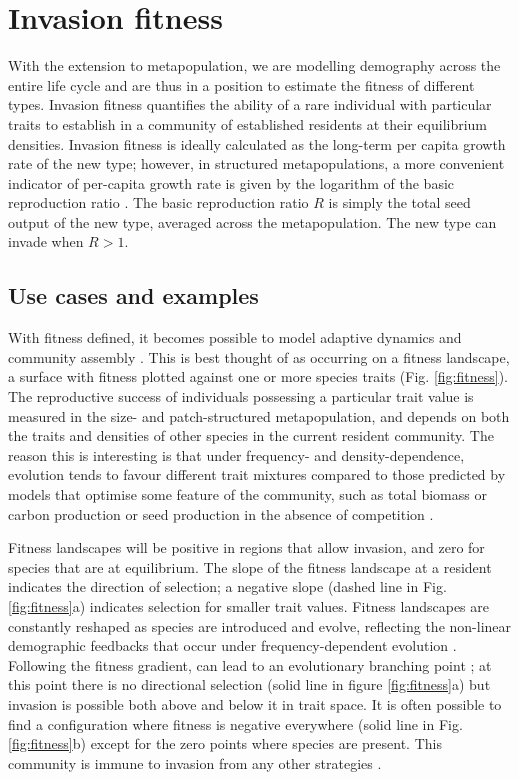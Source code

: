 \documentclass[a4paper,11pt]{article}
\begin{document}
\section{Invasion fitness}

With the extension to metapopulation, we are modelling demography across
the entire life cycle and are thus in a position to estimate the fitness
of different types. Invasion fitness quantifies the ability of a rare
individual with particular traits to establish in a community of
established residents at their equilibrium densities\citep{Metz-1992}.
Invasion fitness
is ideally calculated as the long-term per capita growth rate of the new
type; however, in structured metapopulations, a more convenient
indicator of per-capita growth rate is given by the logarithm of the
basic reproduction ratio \citep{Gyllenberg-2001, Metz-2001}. The basic
reproduction ratio \(R\) is simply the total seed output of the new
type, averaged across the metapopulation. The new type can invade when
\(R > 1\).

\subsection{Use cases and examples}

With fitness defined, it becomes possible to model adaptive dynamics
and community assembly \citep{Dieckmann-2007, Geritz-1998}. This is best
thought of as occurring on a fitness landscape, a surface with fitness
plotted against one or more species traits (Fig. \ref{fig:fitness}). The
reproductive success of individuals possessing a particular trait value
is measured in the size- and patch-structured metapopulation, and
depends on both the traits and densities of other species in the current
resident community. The reason this is interesting is that under
frequency- and density-dependence, evolution tends to favour different
trait mixtures compared to those predicted by models that optimise some
feature of the community, such as total biomass or carbon production or
seed production in the absence of competition
\citep{Falster-2003, Dieckmann-2007}.

Fitness landscapes will be positive in regions that allow invasion, and
zero for species that are at equilibrium. The slope of the fitness
landscape at a resident indicates the direction of selection; a negative
slope (dashed line in Fig. \ref{fig:fitness}a) indicates selection for
smaller trait values. Fitness landscapes are constantly reshaped
as species are introduced and evolve, reflecting the non-linear
demographic feedbacks that occur under frequency-dependent evolution
 \citep{Geritz-1998,Dieckmann-2007}. Following the fitness gradient, can lead to an
evolutionary branching point \citep{Geritz-1998,Dieckmann-2007};
at this point there is no directional selection (solid line in
figure \ref{fig:fitness}a) but invasion is possible both above and below
it in trait space. It is often possible
to find a configuration where fitness is negative everywhere (solid line
in Fig. \ref{fig:fitness}b) except for the zero points where species are
present. This community is immune to invasion from any other strategies
\citep{Geritz-1998}.
\end{document}
